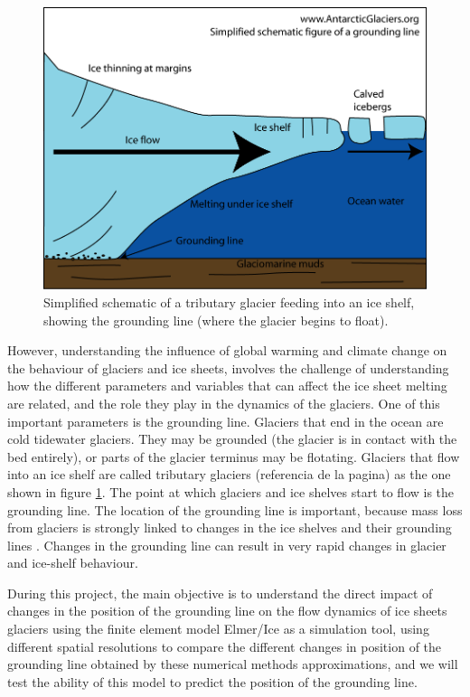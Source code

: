 \documentclass[a4paper,12pt]{article}
\begin{document}
\begin{figure}[!h]
	\centering
	\includegraphics[width=0.7\linewidth]{../fig/groundingline}
	\caption{Simplified schematic of a tributary glacier feeding into an ice shelf, showing the grounding line (where the glacier begins to float).}
	\label{groundingline}
\end{figure}

However, understanding the influence of global warming and climate change on the behaviour of glaciers and ice sheets, involves the challenge of understanding how the different parameters and variables that can affect the ice sheet melting are related, and the role they play in the dynamics of the glaciers. One of this important parameters is the grounding line. Glaciers that end in the ocean are cold tidewater glaciers. They may be grounded (the glacier is in contact with the bed entirely), or parts of the glacier terminus may be flotating. Glaciers that flow into an ice shelf are called tributary glaciers (referencia de la pagina) as the one shown in figure \ref{groundingline}. The point at which  glaciers and ice shelves start to flow is the grounding line. The location of the grounding line is important, because mass loss from glaciers is strongly linked to changes in the ice shelves and their grounding lines \cite[]{brunt2010mapping,pritchard2012antarctic}. Changes in the grounding line can result in very rapid changes in glacier and ice-shelf behaviour.

During this project, the main objective is to understand the direct impact of changes in the position of the grounding line on the flow dynamics of ice sheets glaciers using the finite element model Elmer/Ice as a simulation tool, using different spatial resolutions to compare the different changes in position of the grounding line obtained by these numerical methods approximations, and we will test the ability of this model to predict the position of the grounding line.
\end{document}
